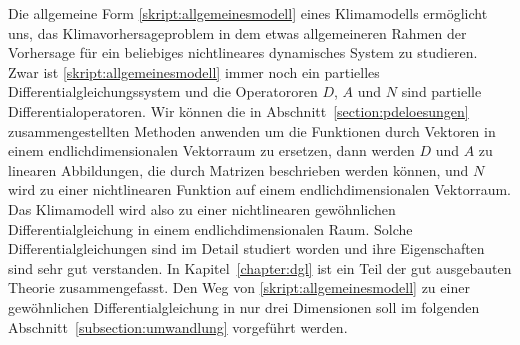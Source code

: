 Die allgemeine Form \eqref{skript:allgemeinesmodell} eines Klimamodells
ermöglicht uns, das Klimavorhersageproblem in dem etwas allgemeineren
Rahmen der Vorhersage für ein beliebiges nichtlineares dynamisches
System zu studieren.
Zwar ist \eqref{skript:allgemeinesmodell} immer noch ein partielles
Differentialgleichungssystem und die Operatororen $D$, $A$ und $N$
sind partielle Differentialoperatoren.
Wir können die in Abschnitt~\ref{section:pdeloesungen} zusammengestellten
Methoden anwenden um die Funktionen durch
Vektoren in einem endlichdimensionalen Vektorraum zu ersetzen, dann
werden $D$ und $A$ zu linearen Abbildungen, die durch Matrizen beschrieben
werden können, und $N$ wird zu einer nichtlinearen Funktion auf einem
endlichdimensionalen Vektorraum.
Das Klimamodell wird also zu einer nichtlinearen gewöhnlichen
Differentialgleichung in einem endlichdimensionalen Raum.
Solche Differentialgleichungen sind im Detail studiert worden und ihre
Eigenschaften sind sehr gut verstanden.
In Kapitel~\ref{chapter:dgl} ist ein Teil der gut ausgebauten
Theorie zusammengefasst.
Den Weg von \eqref{skript:allgemeinesmodell} zu einer gewöhnlichen
Differentialgleichung in nur drei Dimensionen soll im folgenden 
Abschnitt~\ref{subsection:umwandlung} vorgeführt werden.


